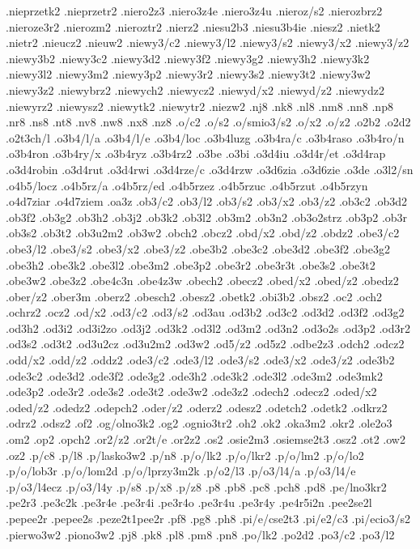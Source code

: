 {.nieprzetk2
.nieprzetr2
.niero2z3
.niero3z4e
.niero3z4u
.nieroz/s2
.nierozbrz2
.nieroze3r2
.nierozm2
.nieroztr2
.nierz2
.niesu2b3
.niesu3b4ie
.niesz2
.nietk2
.nietr2
.nieucz2
.nieuw2
.niewy3/c2
.niewy3/l2
.niewy3/s2
.niewy3/x2
.niewy3/z2
.niewy3b2
.niewy3c2
.niewy3d2
.niewy3f2
.niewy3g2
.niewy3h2
.niewy3k2
.niewy3l2
.niewy3m2
.niewy3p2
.niewy3r2
.niewy3s2
.niewy3t2
.niewy3w2
.niewy3z2
.niewybrz2
.niewych2
.niewycz2
.niewyd/x2
.niewyd/z2
.niewydz2
.niewyrz2
.niewysz2
.niewytk2
.niewytr2
.niezw2
.nj8
.nk8
.nl8
.nm8
.nn8
.np8
.nr8
.ns8
.nt8
.nv8
.nw8
.nx8
.nz8
.o/c2
.o/s2
.o/smio3/s2
.o/x2
.o/z2
.o2b2
.o2d2
.o2t3ch/l
.o3b4/l/a
.o3b4/l/e
.o3b4/loc
.o3b4luzg
.o3b4ra/c
.o3b4raso
.o3b4ro/n
.o3b4ron
.o3b4ry/x
.o3b4ryz
.o3b4rz2
.o3be
.o3bi
.o3d4iu
.o3d4r/et
.o3d4rap
.o3d4robin
.o3d4rut
.o3d4rwi
.o3d4rze/c
.o3d4rzw
.o3d6zia
.o3d6zie
.o3de
.o3l2/sn
.o4b5/locz
.o4b5rz/a
.o4b5rz/ed
.o4b5rzez
.o4b5rzuc
.o4b5rzut
.o4b5rzyn
.o4d7ziar
.o4d7ziem
.oa3z
.ob3/c2
.ob3/l2
.ob3/s2
.ob3/x2
.ob3/z2
.ob3c2
.ob3d2
.ob3f2
.ob3g2
.ob3h2
.ob3j2
.ob3k2
.ob3l2
.ob3m2
.ob3n2
.ob3o2strz
.ob3p2
.ob3r
.ob3s2
.ob3t2
.ob3u2m2
.ob3w2
.obch2
.obcz2
.obd/x2
.obd/z2
.obdz2
.obe3/c2
.obe3/l2
.obe3/s2
.obe3/x2
.obe3/z2
.obe3b2
.obe3c2
.obe3d2
.obe3f2
.obe3g2
.obe3h2
.obe3k2
.obe3l2
.obe3m2
.obe3p2
.obe3r2
.obe3r3t
.obe3s2
.obe3t2
.obe3w2
.obe3z2
.obe4c3n
.obe4z3w
.obech2
.obecz2
.obed/x2
.obed/z2
.obedz2
.ober/z2
.ober3m
.oberz2
.obesch2
.obesz2
.obetk2
.obi3b2
.obsz2
.oc2
.och2
.ochrz2
.ocz2
.od/x2
.od3/c2
.od3/s2
.od3au
.od3b2
.od3c2
.od3d2
.od3f2
.od3g2
.od3h2
.od3i2
.od3i2zo
.od3j2
.od3k2
.od3l2
.od3m2
.od3n2
.od3o2s
.od3p2
.od3r2
.od3s2
.od3t2
.od3u2cz
.od3u2m2
.od3w2
.od5/z2
.od5z2
.odbe2z3
.odch2
.odcz2
.odd/x2
.odd/z2
.oddz2
.ode3/c2
.ode3/l2
.ode3/s2
.ode3/x2
.ode3/z2
.ode3b2
.ode3c2
.ode3d2
.ode3f2
.ode3g2
.ode3h2
.ode3k2
.ode3l2
.ode3m2
.ode3mk2
.ode3p2
.ode3r2
.ode3s2
.ode3t2
.ode3w2
.ode3z2
.odech2
.odecz2
.oded/x2
.oded/z2
.odedz2
.odepch2
.oder/z2
.oderz2
.odesz2
.odetch2
.odetk2
.odkrz2
.odrz2
.odsz2
.of2
.og/olno3k2
.og2
.ognio3tr2
.oh2
.ok2
.oka3m2
.okr2
.ole2o3
.om2
.op2
.opch2
.or2/z2
.or2t/e
.or2z2
.os2
.osie2m3
.osiemse2t3
.osz2
.ot2
.ow2
.oz2
.p/c8
.p/l8
.p/lasko3w2
.p/n8
.p/o/lk2
.p/o/lkr2
.p/o/lm2
.p/o/lo2
.p/o/lob3r
.p/o/lom2d
.p/o/lprzy3m2k
.p/o2/l3
.p/o3/l4/a
.p/o3/l4/e
.p/o3/l4ecz
.p/o3/l4y
.p/s8
.p/x8
.p/z8
.p8
.pb8
.pc8
.pch8
.pd8
.pe/lno3kr2
.pe2r3
.pe3c2k
.pe3r4e
.pe3r4i
.pe3r4o
.pe3r4u
.pe3r4y
.pe4r5i2n
.pee2se2l
.pepee2r
.pepee2s
.peze2t1pee2r
.pf8
.pg8
.ph8
.pi/e/cse2t3
.pi/e2/c3
.pi/ecio3/s2
.pierwo3w2
.piono3w2
.pj8
.pk8
.pl8
.pm8
.pn8
.po/lk2
.po2d2
.po3/c2
.po3/l2
}
